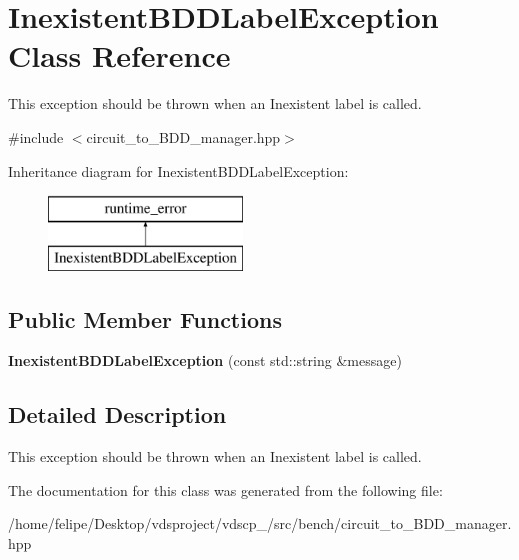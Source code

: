 \section{Inexistent\+B\+D\+D\+Label\+Exception Class Reference}
\label{classInexistentBDDLabelException}


This exception should be thrown when an Inexistent label is called.  




{\ttfamily \#include $<$circuit\+\_\+to\+\_\+\+B\+D\+D\+\_\+manager.\+hpp$>$}

Inheritance diagram for Inexistent\+B\+D\+D\+Label\+Exception\+:\begin{figure}[H]
\begin{center}
\leavevmode
\includegraphics[height=2.000000cm]{classInexistentBDDLabelException}
\end{center}
\end{figure}
\subsection*{Public Member Functions}
\begin{DoxyCompactItemize}
\item 
{\bfseries Inexistent\+B\+D\+D\+Label\+Exception} (const std\+::string \&message)\label{classInexistentBDDLabelException_a04979bc3d74b3d2ec7b0232639b9c862}

\end{DoxyCompactItemize}


\subsection{Detailed Description}
This exception should be thrown when an Inexistent label is called. 

The documentation for this class was generated from the following file\+:\begin{DoxyCompactItemize}
\item 
/home/felipe/\+Desktop/vdsproject/vdscp\+\_/src/bench/circuit\+\_\+to\+\_\+\+B\+D\+D\+\_\+manager.\+hpp\end{DoxyCompactItemize}
